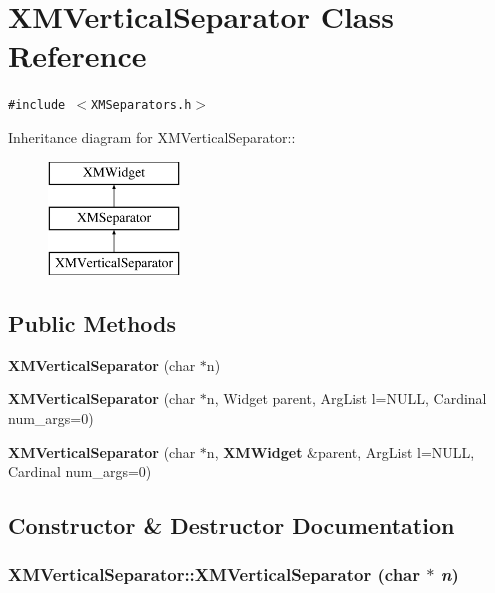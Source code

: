 \section{XMVertical\-Separator  Class Reference}
\label{classXMVerticalSeparator}
{\tt \#include $<$XMSeparators.h$>$}

Inheritance diagram for XMVertical\-Separator::\begin{figure}[H]
\begin{center}
\leavevmode
\includegraphics[height=3cm]{classXMVerticalSeparator}
\end{center}
\end{figure}
\subsection*{Public Methods}
\begin{CompactItemize}
\item 
{\bf XMVertical\-Separator} (char $\ast$n)
\item 
{\bf XMVertical\-Separator} (char $\ast$n, Widget parent, Arg\-List l=NULL, Cardinal num\_\-args=0)
\item 
{\bf XMVertical\-Separator} (char $\ast$n, {\bf XMWidget} \&parent, Arg\-List l=NULL, Cardinal num\_\-args=0)
\end{CompactItemize}


\subsection{Constructor \& Destructor Documentation}
\subsubsection{\setlength{\rightskip}{0pt plus 5cm}XMVertical\-Separator::XMVertical\-Separator (char $\ast$ {\em n})\hspace{0.3cm}{\tt  [inline]}}\label{classXMVerticalSeparator_a0}




